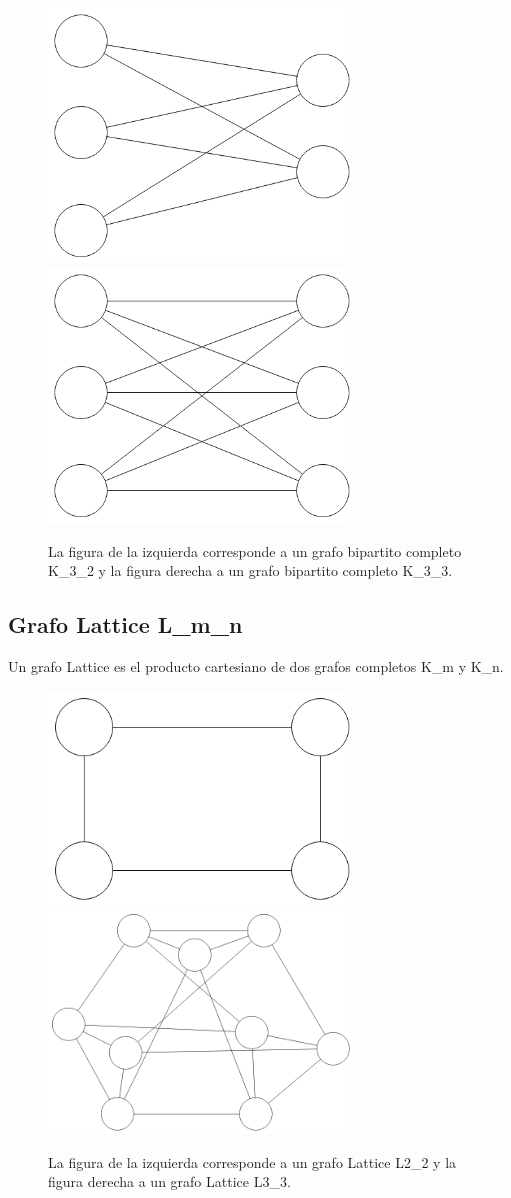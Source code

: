 \begin{figure}[H]
\includegraphics[width=80mm]{K3_2.png}
\includegraphics[width=80mm]{K3_3.png}
\caption{La figura de la izquierda corresponde a un grafo bipartito completo K_3_2 y la figura derecha a un grafo bipartito completo K_3_3.}
\label{overflow}
\end{figure}


\subsection{Grafo Lattice L_m_n}
Un grafo Lattice es el producto cartesiano de dos grafos completos K_m y K_n.

\begin{figure}[H]
\includegraphics[width=80mm]{L2_2.png}
\includegraphics[width=80mm]{L3_3.png}
\caption{La figura de la izquierda corresponde a un grafo Lattice L2_2 y la figura derecha a un grafo Lattice L3_3.}
\label{overflow}
\end{figure}